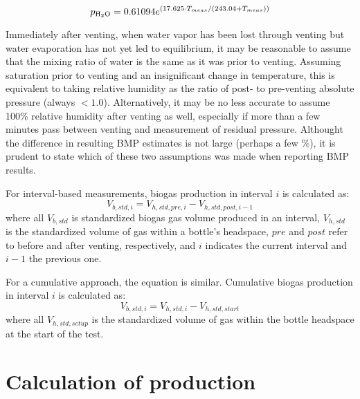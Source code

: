 \documentclass[]{article}
\begin{document}
\begin{equation}
\label{eq:magnus}
   p\textsubscript{H$_2$O} = 0.61094 e^{(17.625 \cdot T_{meas}/(243.04 + T_{meas}))}
\end{equation}

Immediately after venting, when water vapor has been lost through venting but water evaporation has not yet led to equilibrium, it may be reasonable to assume that the mixing ratio of water is the same as it was prior to venting.
Assuming saturation prior to venting and an insignificant change in temperature, this is equivalent to taking relative humidity as the ratio of post- to pre-venting absolute pressure (always $<1.0$). 
Alternatively, it may be no less accurate to assume 100\% relative humidity after venting as well, especially if more than a few minutes pass between venting and measurement of residual pressure.
Althought the difference in resulting BMP estimates is not large (perhaps a few \%), it is prudent to state which of these two assumptions was made when reporting BMP results.

For interval-based measurements, biogas production in interval $i$ is calculated as:
\begin{equation}
  \label{eq:bgint}
  V_{b, std, i} = V_{h, std, pre, i} - V_{h, std, post, i - 1}
\end{equation}
where all $V_{b, std}$ is standardized biogas gas volume produced in an interval, $V_{h, std}$ is the standardized volume of gas within a bottle's headspace,  $pre$ and $post$ refer to before and after venting, respectively, and $i$ indicates the current interval and $i-1$ the previous one.

For a cumulative approach, the equation is similar.
Cumulative biogas production in interval $i$ is calculated as:
\begin{equation}
  \label{eq:bgcum}
  V_{b, std, i} = V_{h, std, i} - V_{h, std, start}
\end{equation}
where all $V_{h, std, setup}$ is the standardized volume of gas within the bottle headspace at the start of the test.

\section{Calculation of  production}
\end{document}
